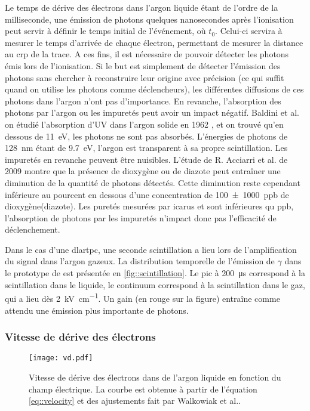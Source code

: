         Le temps de dérive des électrons dans l'argon liquide étant de l'ordre de la milliseconde, une émission de photons quelques nanosecondes après l'ionisation peut servir à définir le temps initial de l'événement, où $t_0$. Celui-ci servira à mesurer le temps d'arrivée de chaque électron, permettant de mesurer la distance au \gls{crp} de la trace. A ces fins, il est nécessaire de pouvoir détecter les photons émis lors de l'ionisation. Si le but est simplement de détecter l'émission des photons sans chercher à reconstruire leur origine avec précision (ce qui suffit quand on utilise les photons comme déclencheurs), les différentes diffusions de ces photons dans l'argon n'ont pas d'importance. En revanche, l'absorption des photons par l'argon ou les impuretés peut avoir un impact négatif. Baldini et al. on étudié l'absorption d'UV dans l'argon solide en 1962 \cite{Baldini1962}, et on trouvé qu'en dessous de \SI{11}{\eV}, les photons ne sont pas absorbés. L'énergies de photons de \SI{128}{\nano\meter} étant de \SI{9.7}{\eV}, l'argon est transparent à sa propre scintillation. Les impuretés en revanche peuvent être nuisibles. L'étude de R. Acciarri et al. de 2009\cite{Acciarri2009} montre que la présence de dioxygène ou de diazote peut entraîner une diminution de la quantité de photons détectés. Cette diminution reste cependant inférieure au pourcent en dessous d'une concentration de \SI{100(1000)}{ppb} de dioxygène(diazote). Les puretés mesurées par \gls{icarus}\cite{Antonello2014} et \protosp{} sont inférieures qu \si{ppb}, l'absorption de photons par les impuretés n'impact donc pas l'efficacité de déclenchement.

        Dans le cas d'une \gls{dlartpc}, une seconde scintillation a lieu lors de l'amplification du signal dans l'argon gazeux. La distribution temporelle de l'émission de $\gamma$ dans le prototype de \TOO{} est présentée en \autoref{fig::scintillation}. Le pic à \SI{200}{\micro\second} correspond à la scintillation dans le liquide, le continuum correspond à la scintillation dans le gaz, qui a lieu dès \SI{2}{\kilo\volt\per\centi\meter}. Un gain (en rouge sur la figure) entraîne comme attendu une émission plus importante de photons.

      \subsubsection{Vitesse de dérive des électrons}\label{sec::vitesse_derive}

        \begin{figure}[htbp]
          \centering
          \texttt{[image: vd.pdf]}
          \caption[Vitesse de dérive des électrons dans de l'argon liquide en fonction du champ électrique]{\label{fig::velocity}Vitesse de dérive des électrons dans de l'argon liquide en fonction du champ électrique. La courbe est obtenue à partir de l'équation \eqref{eq::velocity} et des ajustements fait par Walkowiak et al.\cite{Walkowiak2000}.}
        \end{figure}

